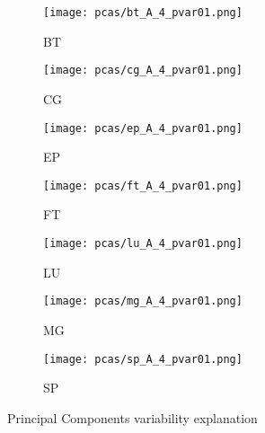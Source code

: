 \begin{figure}
    \centering
    \begin{subfigure}[b]{0.3\textwidth}
        \texttt{[image: pcas/bt\_A\_4\_pvar01.png]}
        \caption{BT}
        \label{fig:bt_pcv_hwc2}
    \end{subfigure}
    \quad
    \begin{subfigure}[b]{0.3\textwidth}
        \texttt{[image: pcas/cg\_A\_4\_pvar01.png]}
        \caption{CG}
        \label{fig:cg_pcv_hwc2}
    \end{subfigure}
    \quad
    \begin{subfigure}[b]{0.3\textwidth}
        \texttt{[image: pcas/ep\_A\_4\_pvar01.png]}
        \caption{EP}
        \label{fig:ep_pcv_hwc2}
    \end{subfigure}
    
    \begin{subfigure}[b]{0.3\textwidth}
        \texttt{[image: pcas/ft\_A\_4\_pvar01.png]}
        \caption{FT}
        \label{fig:ft_pcv_hwc2}
    \end{subfigure}
    \quad
    \begin{subfigure}[b]{0.3\textwidth}
        \texttt{[image: pcas/lu\_A\_4\_pvar01.png]}
        \caption{LU}
        \label{fig:lu_pcv_hwc2}
    \end{subfigure}
    \quad
    \begin{subfigure}[b]{0.3\textwidth}
        \texttt{[image: pcas/mg\_A\_4\_pvar01.png]}
        \caption{MG}
        \label{fig:mg_pcv_hwc2}
    \end{subfigure}

    \begin{subfigure}[b]{0.3\textwidth}
        \texttt{[image: pcas/sp\_A\_4\_pvar01.png]}
        \caption{SP}
        \label{fig:sp_pcv_hwc2}
    \end{subfigure}
    \caption{Principal Components variability explanation}
\end{figure}


